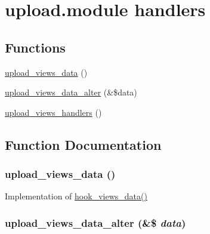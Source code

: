 \hypertarget{group__views__upload__module}{
\section{upload.module handlers}
\label{group__views__upload__module}
}
\subsection*{Functions}
\begin{CompactItemize}
\item 
\hyperlink{group__views__upload__module_ga4924ec055335adab5d50803f2355a62}{upload\_\-views\_\-data} ()
\item 
\hyperlink{group__views__upload__module_gd15600528a5078578b1cc7ebe5e4e210}{upload\_\-views\_\-data\_\-alter} (\&\$data)
\item 
\hyperlink{group__views__upload__module_gc45654d1a172945c169b1bdbf317b3ee}{upload\_\-views\_\-handlers} ()
\end{CompactItemize}


\subsection{Function Documentation}
\hypertarget{group__views__upload__module_ga4924ec055335adab5d50803f2355a62}{
\subsubsection[{upload\_\-views\_\-data}]{\setlength{\rightskip}{0pt plus 5cm}upload\_\-views\_\-data ()}}
\label{group__views__upload__module_ga4924ec055335adab5d50803f2355a62}


Implementation of \hyperlink{group__views__hooks_g227057901681e4a33e33c199c7a8c989}{hook\_\-views\_\-data()} \hypertarget{group__views__upload__module_gd15600528a5078578b1cc7ebe5e4e210}{
\subsubsection[{upload\_\-views\_\-data\_\-alter}]{\setlength{\rightskip}{0pt plus 5cm}upload\_\-views\_\-data\_\-alter (\&\$ {\em data})}}
\label{group__views__upload__module_gd15600528a5078578b1cc7ebe5e4e210}


